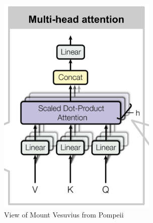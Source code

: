 \documentclass[12pt]{article}
\begin{document}
\begin{figure}[h!]
\centering
\includegraphics[width=3in]
{multi-head-att.jpg}
\caption{View of Mount Vesuvius from
  Pompeii}
\label{fig-jpg}
\end{figure}
\end{document}
